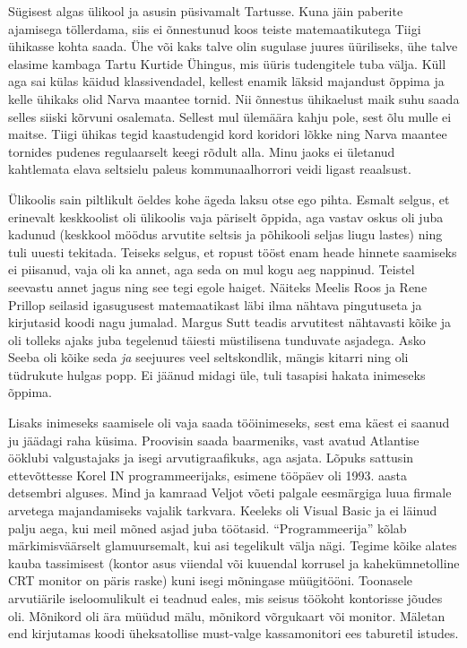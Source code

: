 Sügisest algas ülikool ja asusin püsivamalt Tartusse. Kuna jäin paberite ajamisega 
töllerdama, siis ei õnnestunud koos teiste matemaatikutega Tiigi ühikasse kohta saada. Ühe või kaks talve olin sugulase juures üüriliseks, ühe talve 
elasime kambaga Tartu Kurtide Ühingus, mis üüris
tudengitele tuba välja. Küll aga sai külas käidud klassivendadel, kellest enamik 
läksid majandust õppima ja kelle ühikaks olid Narva maantee 
tornid. Nii õnnestus ühikaelust maik suhu saada selles siiski kõrvuni osalemata. 
Sellest mul ülemäära kahju pole, sest õlu mulle ei maitse. Tiigi ühikas 
tegid kaastudengid kord koridori lõkke ning Narva maantee tornides pudenes regulaarselt 
keegi rõdult alla. Minu jaoks ei ületanud kahtlemata elava seltsielu paleus 
kommunaalhorrori veidi ligast reaalsust. 

Ülikoolis sain piltlikult öeldes kohe ägeda laksu otse ego pihta. Esmalt 
selgus, et erinevalt keskkoolist oli ülikoolis vaja päriselt õppida, aga vastav oskus 
oli juba kadunud (keskkool möödus arvutite seltsis ja põhikooli seljas 
liugu lastes) ning tuli uuesti tekitada. Teiseks selgus, et 
ropust tööst enam heade hinnete saamiseks ei piisanud, vaja oli ka annet, aga 
seda on mul kogu aeg nappinud. Teistel seevastu annet jagus 
ning see tegi egole haiget. Näiteks Meelis Roos 
ja Rene Prillop seilasid igasugusest matemaatikast läbi 
ilma nähtava pingutuseta ja kirjutasid koodi nagu jumalad. Margus 
Sutt teadis arvutitest nähtavasti kõike ja oli tolleks 
ajaks juba tegelenud täiesti müstilisena tunduvate asjadega. Asko 
Seeba oli kõike seda \emph{ja} seejuures veel 
seltskondlik, mängis kitarri ning oli tüdrukute hulgas popp. Ei jäänud 
midagi üle, tuli tasapisi hakata inimeseks õppima. 

Lisaks inimeseks saamisele oli vaja saada tööinimeseks, sest ema käest ei 
saanud ju jäädagi raha küsima. Proovisin saada baarmeniks, vast avatud Atlantise ööklubi valgustajaks ja isegi 
arvutigraafikuks, aga asjata. Lõpuks sattusin ettevõttesse Korel 
IN programmeerijaks, esimene tööpäev oli 1993. aasta detsembri alguses. Mind ja kamraad Veljot võeti palgale 
eesmärgiga luua firmale arvetega majandamiseks vajalik tarkvara. Keeleks oli 
Visual Basic ja ei läinud palju aega, kui meil mõned asjad 
juba töötasid. \enquote{Programmeerija} kõlab märkimisväärselt glamuursemalt, 
kui asi tegelikult välja nägi. Tegime kõike alates kauba tassimisest (kontor 
asus viiendal või kuuendal korrusel ja kahekümnetolline CRT monitor on päris 
raske) kuni isegi mõningase müügitööni. Toonasele arvutiärile iseloomulikult 
ei teadnud eales, mis seisus töökoht kontorisse jõudes oli. Mõnikord oli ära 
müüdud mälu, mõnikord võrgukaart või monitor. Mäletan end kirjutamas koodi 
üheksatollise must-valge kassamonitori ees taburetil istudes\label{sisu:jupimyyk}. 

